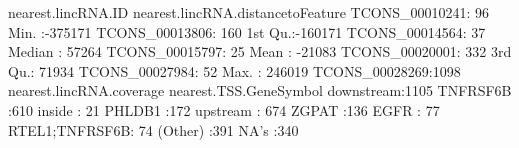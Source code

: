 \documentclass[a4paper]{article}
\begin{document}
\begin{Schunk}
\begin{Soutput}
      nearest.lincRNA.ID nearest.lincRNA.distancetoFeature
 TCONS_00010241:  96     Min.   :-375171                  
 TCONS_00013806: 160     1st Qu.:-160171                  
 TCONS_00014564:  37     Median :  57264                  
 TCONS_00015797:  25     Mean   : -21083                  
 TCONS_00020001: 332     3rd Qu.:  71934                  
 TCONS_00027984:  52     Max.   : 246019                  
 TCONS_00028269:1098                                      
 nearest.lincRNA.coverage    nearest.TSS.GeneSymbol
 downstream:1105          TNFRSF6B      :610       
 inside    :  21          PHLDB1        :172       
 upstream  : 674          ZGPAT         :136       
                          EGFR          : 77       
                          RTEL1;TNFRSF6B: 74       
                          (Other)       :391       
                          NA's          :340       
   

\end{Soutput}
\end{Schunk}
\end{document}
